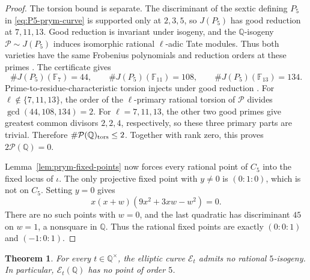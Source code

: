 \documentclass[11pt,a4paper]{amsart}
\newtheorem{theorem}{Theorem}[section]
\theoremstyle{definition}
\theoremstyle{remark}
\numberwithin{equation}{section}
\newcommand{\Q}{\mathbb{Q}}
\newcommand{\mathcalE}{\mathcal{E}}
\begin{document}
\begin{proof}
The torsion bound is separate. The discriminant of the sextic defining
\(P_5\) in \eqref{eq:P5-prym-curve} is supported only at \(2,3,5\), so \(J(P_5)\) has good reduction at \(7,11,13\).
Good reduction is invariant under isogeny, and the \(\Q\)-isogeny
\(\mathcal P\sim J(P_5)\) induces isomorphic rational \(\ell\)-adic
Tate modules. Thus both varieties have the same Frobenius polynomials
and reduction orders at these primes
\cite[Chapter~IV, Theorem~3.5, Corollary~3.6 and the following
discussion]{milne2008abelian}. The certificate gives
\[
\#J(P_5)(\mathbb F_7)=44,\qquad
\#J(P_5)(\mathbb F_{11})=108,\qquad
\#J(P_5)(\mathbb F_{13})=134.
\]
Prime-to-residue-characteristic torsion injects under good reduction
\cite[Chapter~IV, proof of Theorem~3.5]{milne2008abelian}.
For \(\ell\notin\{7,11,13\}\), the order of the \(\ell\)-primary
rational torsion of \(\mathcal P\) divides \(\gcd(44,108,134)=2\).
For \(\ell=7,11,13\), the other two good primes give greatest common
divisors \(2,2,4\), respectively, so these three primary parts are
trivial. Therefore \(\#\mathcal P(\Q)_{\rm tors}\leq2\).
Together with rank zero, this proves \(2\mathcal P(\Q)=0\).

Lemma~\ref{lem:prym-fixed-points} now forces every rational point of
\(C_5\) into the fixed locus of \(\iota\). The only projective fixed
point with \(y\neq0\) is \((0:1:0)\), which is not on \(C_5\).
Setting \(y=0\) gives
\[
x(x+w)(9x^2+3xw-w^2)=0.
\]
There are no such points with \(w=0\), and the last quadratic has
discriminant \(45\) on \(w=1\), a nonsquare in \(\Q\). Thus the rational
fixed points are exactly \((0:0:1)\) and \((-1:0:1)\).
\end{proof}

\begin{theorem}\label{thm:no-5-torsion}
For every \(t\in\Q^\times\), the elliptic curve \(\mathcalE_t\) admits
no rational \(5\)-isogeny. In particular, \(\mathcalE_t(\Q)\) has no
point of order \(5\).
\end{theorem}
\end{document}
